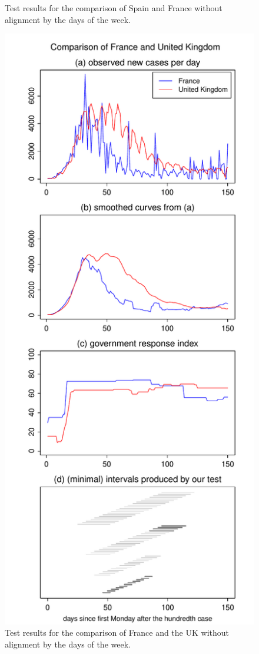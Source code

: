 \documentclass[a4paper,12pt]{article}
\numberwithin{equation}{section}
\begin{document}
{\begin{figure}[p!]
\begin{minipage}[t]{0.49\textwidth}
\caption{Test results for the comparison of Spain and France without alignment by the days of the week.}
\end{minipage}
\hspace{0.25cm}
\begin{minipage}[t]{0.49\textwidth}
\includegraphics[width=\textwidth]{plots/FRA_vs_GBR_wa}
\caption{Test results for the comparison of France and the UK without alignment by the days of the week.}
\end{minipage}
\end{figure}

}
\end{document}
